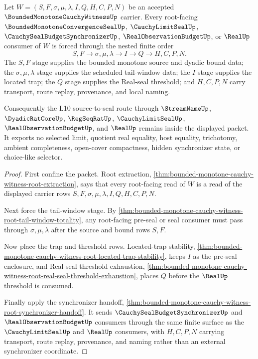 \begin{theorem}
\label{thm:bounded-monotone-cauchy-witness-root-tail-seal-nesting}
Let $W=(S,F,\sigma,\mu,\lambda,I,Q,H,C,P,N)$ be an accepted $\BoundedMonotoneCauchyWitnessUp$ carrier. Every root-facing $\BoundedMonotoneConvergenceSealUp$, $\CauchyLimitSealUp$, $\CauchySealBudgetSynchronizerUp$, $\RealObservationBudgetUp$, or $\RealUp$ consumer of $W$ is forced through the nested finite order
$$
S,F \longrightarrow \sigma,\mu,\lambda \longrightarrow I \longrightarrow Q \longrightarrow H,C,P,N.
$$
The $S,F$ stage supplies the bounded monotone source and dyadic bound data; the $\sigma,\mu,\lambda$ stage supplies the scheduled tail-window data; the $I$ stage supplies the located trap; the $Q$ stage supplies the Real-seal threshold; and $H,C,P,N$ carry transport, route replay, provenance, and local naming.

Consequently the L10 source-to-seal route through $\StreamNameUp$, $\DyadicRatCoreUp$, $\RegSeqRatUp$, $\CauchyLimitSealUp$, $\RealObservationBudgetUp$, and $\RealUp$ remains inside the displayed packet. It exports no selected limit, quotient real equality, host equality, trichotomy, ambient completeness, open-cover compactness, hidden synchronizer state, or choice-like selector.
\end{theorem}
\begin{proof}
First confine the packet. Root extraction, \autoref{thm:bounded-monotone-cauchy-witness-root-extraction}, says that every root-facing read of $W$ is a read of the displayed carrier rows $S,F,\sigma,\mu,\lambda,I,Q,H,C,P,N$.

Next force the tail-window stage. By \autoref{thm:bounded-monotone-cauchy-witness-root-tail-window-totality}, any root-facing pre-seal or seal consumer must pass through $\sigma,\mu,\lambda$ after the source and bound rows $S,F$.

Now place the trap and threshold rows. Located-trap stability, \autoref{thm:bounded-monotone-cauchy-witness-root-located-trap-stability}, keeps $I$ as the pre-seal enclosure, and Real-seal threshold exhaustion, \autoref{thm:bounded-monotone-cauchy-witness-root-real-seal-threshold-exhaustion}, places $Q$ before the $\RealUp$ threshold is consumed.

Finally apply the synchronizer handoff, \autoref{thm:bounded-monotone-cauchy-witness-root-synchronizer-handoff}. It sends $\CauchySealBudgetSynchronizerUp$ and $\RealObservationBudgetUp$ consumers through the same finite surface as the $\CauchyLimitSealUp$ and $\RealUp$ consumers, with $H,C,P,N$ carrying transport, route replay, provenance, and naming rather than an external synchronizer coordinate.
\end{proof}

